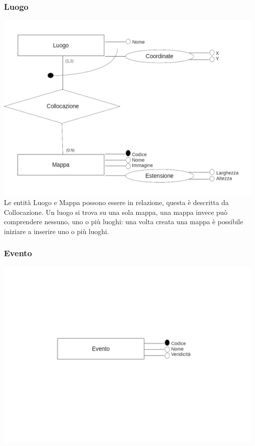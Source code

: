 \documentclass{article}
\begin{document}
\subsubsection{Luogo}
\includegraphics[width=\linewidth]{luogo-scheletro.png}
Le entità Luogo e Mappa possono essere in relazione, questa è descritta da
Collocazione. Un luogo si trova su una sola mappa, una mappa invece può
comprendere nessuno, uno o più luoghi: una volta creata una mappa è possibile
iniziare a inserire uno o più luoghi.
\subsubsection{Evento}
\includegraphics[width=\linewidth]{evento-scheletro.png}
\end{document}
